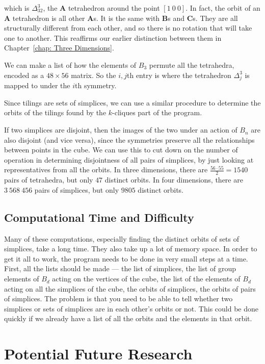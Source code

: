 \documentclass[12pt]{scrippsthesis}
\theoremstyle{definition}
\theoremstyle{remark}
\theoremstyle{plain}
\begin{document}
which is $\Delta^3_{32}$, the {\bf A} tetrahedron around the point $[1\ 0\ 0]$.  In fact, the orbit of an {\bf A} tetrahedron is all other {\bf A}s.  It is the same with {\bf B}s and {\bf C}s.  They are all structurally different from each other, and so there is no rotation that will take one to another.  This reaffirms our earlier distinction between them in Chapter~\ref{chap: Three Dimensions}. 

We can make a list of how the elements of $B_3$ permute all the tetrahedra, encoded as a $48 \times 56$ matrix.  So the $i,j$th entry is where the tetrahedron $\Delta^3_j$ is mapped to under the $i$th symmetry.

Since tilings are sets of simplices, we can use a similar procedure to determine the orbits of the tilings found by the $k$-cliques part of the program.

If two simplices are disjoint, then the images of the two under an action of $B_n$ are also disjoint (and vice versa), since the symmetries preserve all the relationships between points in the cube.  We can use this to cut down on the number of operation in determining disjointness of all pairs of simplices, by just looking at representatives from all the orbits.  In three dimensions, there are $\frac{56\cdot55}{2}=1540$ pairs of tetrahedra, but only $47$ distinct orbits.  In four dimensions, there are $3\ 568\ 456$ pairs of simplices, but only $9805$ distinct orbits.


\section{Computational Time and Difficulty}

Many of these computations, especially finding the distinct orbits of sets of simplices, take a long time.  They also take up a lot of memory space.  In order to get it all to work, the program needs to be done in very small steps at a time.  First, all the lists should be made --- the list of simplices, the list of group elements of $B_d$ acting on the vertices of the cube, the list of the elements of $B_d$ acting on all the simplices of the cube, the orbits of simplices, the orbits of pairs of simplices.  The problem is that you need to be able to tell whether two simplices or sets of simplices are in each other's orbits or not.  This could be done quickly if we already have a list of all the orbits and the elements in that orbit.  


\chapter{Potential Future Research}
\end{document}
